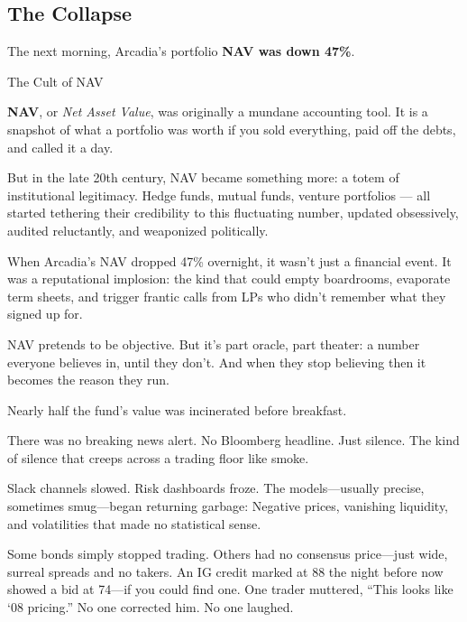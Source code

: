 \subsection{The Collapse}

The next morning, Arcadia’s portfolio \textbf{NAV was down 47\%}.

\medskip

\begin{HistoricalSidebar}{The Cult of NAV}

  \textbf{NAV}, or \textit{Net Asset Value}, was originally a mundane accounting tool. It is a snapshot 
  of what a portfolio was worth if you sold everything, paid off the debts, and called it a day.

  \medskip
  
  But in the late 20th century, NAV became something more: a totem of institutional legitimacy. Hedge funds, 
  mutual funds, venture portfolios — all started tethering their credibility to this fluctuating number, 
  updated obsessively, audited reluctantly, and weaponized politically.

  \medskip
  
  When Arcadia’s NAV dropped 47\% overnight, it wasn’t just a financial event. It was a reputational implosion: 
  the kind that could empty boardrooms, evaporate term sheets, and trigger frantic calls from LPs who didn’t 
  remember what they signed up for.

  \medskip
  
  NAV pretends to be objective. But it’s part oracle, part theater: a number everyone believes in, until they 
  don’t. And when they stop believing then it becomes the reason they run.
  
\end{HistoricalSidebar}

\medskip

Nearly half the fund’s value was incinerated before breakfast.

There was no breaking news alert. No Bloomberg headline. Just silence.
The kind of silence that creeps across a trading floor like smoke.

Slack channels slowed.
Risk dashboards froze.
The models—usually precise, sometimes smug—began returning garbage:
Negative prices, vanishing liquidity, and volatilities that made no statistical sense.

Some bonds simply stopped trading.
Others had no consensus price—just wide, surreal spreads and no takers.
An IG credit marked at 88 the night before now showed a bid at 74—if you could find one.
One trader muttered, “This looks like ‘08 pricing.”
No one corrected him. No one laughed.

